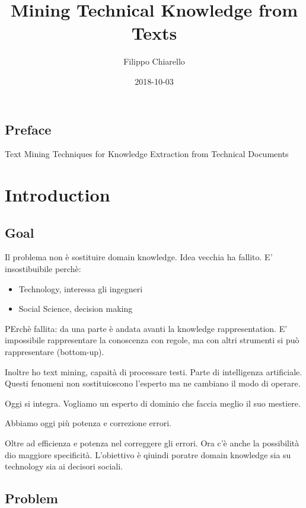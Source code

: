 \documentclass[]{book}
\title{Mining Technical Knowledge from Texts}
\author{Filippo Chiarello}
\date{2018-10-03}
\providecommand{\tightlist}{%
  \setlength{\itemsep}{0pt}\setlength{\parskip}{0pt}}
\begin{document}
\maketitle

{
\setcounter{tocdepth}{1}
\tableofcontents
}
\chapter*{Preface}\label{preface}

Text Mining Techniques for Knowledge Extraction from Technical Documents

\part{Introduction}\label{part-introduction}

\chapter{Goal}\label{goal}

Il problema non è sostituire domain knowledge. Idea vecchia ha fallito.
E' insostibuibile perchè:

\begin{itemize}
\tightlist
\item
  Technology, interessa gli ingegneri
\item
  Social Science, decision making
\end{itemize}

PErchè fallita: da una parte è andata avanti la knowledge
rappresentation. E' impossibile rappresentare la conoscenza con regole,
ma con altri strumenti si può rappresentare (bottom-up).

Inoltre ho text mining, capaità di processare testi. Parte di
intelligenza artificiale. Questi fenomeni non sostituioscono l'esperto
ma ne cambiano il modo di operare.

Oggi si integra. Vogliamo un esperto di dominio che faccia meglio il suo
mestiere.

Abbiamo oggi più potenza e correzione errori.

Oltre ad efficienza e potenza nel correggere gli errori. Ora c'è anche
la possibilità dio maggiore specificità. L'obiettivo è qiuindi poratre
domain knowledge sia su technology sia ai decisori sociali.

\chapter{Problem}\label{problem}
\end{document}
